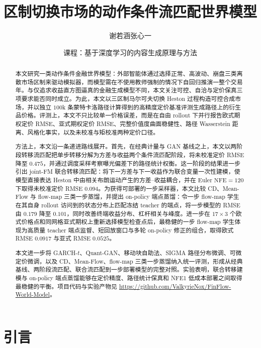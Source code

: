 \documentclass[11pt]{ctexart}
\title{\bfseries 区制切换市场的动作条件流匹配世界模型}
\author{谢若涵\quad 张心一}
\date{课程：基于深度学习的内容生成原理与方法}
\newcommand{\nfe}{\mathrm{NFE}}
\begin{document}
\maketitle

\begin{abstract}
本文研究一类动作条件金融世界模型：外部智能体通过选择正常、高波动、崩盘三类离散市场区制来驱动模拟器，而模型需在不使用教师强制的情况下自回归推演一整个交易年。与仅追求收益直方图逼真的金融生成模型不同，本文关注可控、自洽与定价保真三项要求能否同时成立。为此，本文以三区制马尔可夫切换 Heston 过程构造可控合成市场，并以独立 $100$k 条蒙特卡洛路径计算得到的高精度定价基准评测生成路径上的衍生品价格。评测上，本文不只比较单一价格误差，而是在自由 rollout 下并行报告欧式期权定价 RMSE、亚式期权定价 RMSE、完整价值度曲面稳健性、路径 Wasserstein 距离、风格化事实，以及未校准与矩校准两种定价口径。

方法上，本文沿一条递进路线展开。首先，在经典计量与 GAN 基线之上，本文以两阶段转移流匹配把单步转移分解为方差与收益两个条件流匹配阶段，将未校准定价 RMSE 降至 $0.475$，并通过调度采样考察曝光偏差下的路径统计权衡。这一阶段的结果进一步引出 joint-FM 联合转移流匹配：将下一方差与下一收益作为联合变量一次性建模，使模型直接表达 Heston 中由相关布朗运动产生的方差--收益耦合，并在 Euler $\nfe{=}120$ 下取得未校准定价 RMSE $0.094$。为获得可部署的一步采样器，本文比较 CD、Mean-Flow 与 flow-map 三类一步蒸馏，并提出 on-policy 端点蒸馏：令一步 flow-map 学生在其自身 rollout 访问到的状态分布上匹配冻结 teacher 的端点，将一步模型的 RMSE 由 $0.179$ 降至 $0.101$，同时改善终端收益分布、杠杆相关与峰度。进一步在 $17\times3$ 个欧式价格点和同网格亚式期权上重新选择模型检查点后，最稳健的一步 flow-map 学生体现为高质量 teacher 端点监督、短回放窗口与多轮 on-policy 修正的组合，取得欧式 RMSE $0.0917$ 与亚式 RMSE $0.0525$。

本文进一步将 GARCH-$t$、Quant-GAN、移动块自助法、SIGMA 路径分布微调、可微定价微调，以及 CD、Mean-Flow、flow-map 三类一步蒸馏纳入统一评测，形成从经典基线、两阶段流匹配、联合流匹配到一步部署模型的完整对照。实验表明，联合转移建模与 on-policy 端点蒸馏能够在定价精度、路径统计保真和 NFE1 低成本部署之间取得最稳健的平衡。项目代码与实验产物见 \url{https://github.com/ValkyrieNox/FinFlow-World-Model}。
\end{abstract}

\section{引言}
\label{sec:intro}
\end{document}
